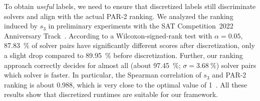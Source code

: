 \documentclass[runningheads]{llncs}
\begin{document}
To obtain \emph{useful} labels, we need to ensure that discretized labels still discriminate solvers and align with the actual PAR-2 ranking.
We analyzed the ranking induced by $s_3$ in preliminary experiments with the SAT Competition~2022 Anniversary Track~\cite{sat2022}.
According to a Wilcoxon-signed-rank test with $\alpha = 0.05$, \SI{87.83}{\%} of solver pairs have significantly different scores after discretization, only a slight drop compared to \SI{89.95}{\%} before discretization.
Further, our ranking approach correctly decides for almost all (about \SI{97.45}{\%}; $\sigma = \SI{3.68}{\%}$) solver pairs which solver is faster.
In particular, the Spearman correlation of $s_3$ and PAR-2 ranking is about \SI{0.988}{}, which is very close to the optimal value of 1~\cite{de2016comparing}.
All these results show that discretized runtimes are suitable for our framework.
\end{document}
